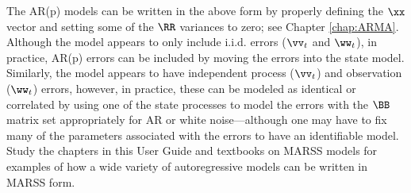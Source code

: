 The AR(p) models can be written in the above form by properly defining the $\xx$ vector and setting some of the $\RR$ variances to zero; see Chapter \ref{chap:ARMA}. Although the model appears to only include i.i.d. errors ($\vv_t$ and $\ww_t$), in practice, AR(p) errors can be included by moving the errors into the state model.  Similarly, the model appears to have independent process ($\vv_t$) and observation ($\ww_t$) errors, however, in practice, these can be modeled as identical or correlated by using one of the state processes to model the errors with the $\BB$ matrix set appropriately for AR or white noise---although one may have to fix many of the parameters associated with the errors to have an identifiable model.  Study the chapters in this User Guide and textbooks on MARSS models for examples of how a wide variety of autoregressive models can be written in MARSS form.  

